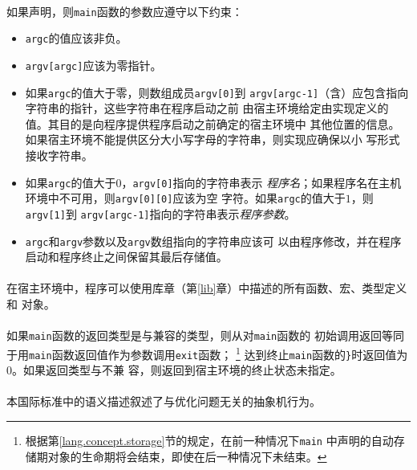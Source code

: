 \paragraph{}
如果声明，则\texttt{main}函数的参数应遵守以下约束：
\begin{itemize}
  \item{\texttt{argc}的值应该非负。}
  \item{\texttt{argv[argc]}应该为零指针。}
  \item{如果\texttt{argc}的值大于零，则数组成员\texttt{argv[0]}到
    \texttt{argv[argc-1]}（含）应包含指向字符串的指针，这些字符串在程序启动之前
    由宿主环境给定由实现定义的值。其目的是向程序提供程序启动之前确定的宿主环境中
    其他位置的信息。如果宿主环境不能提供区分大小写字母的字符串，则实现应确保以小
    写形式接收字符串。}
  \item{如果\texttt{argc}的值大于$0$，\texttt{argv[0]}指向的字符串表示
    \textit{程序名}；如果程序名在主机环境中不可用，则\texttt{argv[0][0]}应该为空
    字符。如果\texttt{argc}的值大于$1$，则\texttt{argv[1]}到
    \texttt{argv[argc-1]}指向的字符串表示\textit{程序参数}。}
  \item{\texttt{argc}和\texttt{argv}参数以及\texttt{argv}数组指向的字符串应该可
    以由程序修改，并在程序启动和程序终止之间保留其最后存储值。}
\end{itemize}

\paragraph{}
在宿主环境中，程序可以使用库章（第\ref{lib}章）中描述的所有函数、宏、类型定义和
对象。

\paragraph{}
如果\texttt{main}函数的返回类型是与兼容的类型，则从对\texttt{main}函数的
初始调用返回等同于用\texttt{main}函数返回值作为参数调用\texttt{exit}函数；
\footnote{根据第\ref{lang.concept.storage}节的规定，在前一种情况下\texttt{main}
中声明的自动存储期对象的生命期将会结束，即使在后一种情况下未结束。}
达到终止\texttt{main}函数的\texttt{\}}时返回值为$0$。如果返回类型与不兼
容，则返回到宿主环境的终止状态未指定。


\paragraph{}
本国际标准中的语义描述叙述了与优化问题无关的抽象机行为。

